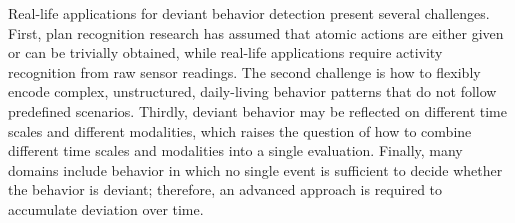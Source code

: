 %
Real-life applications for deviant behavior detection present several challenges. First, plan recognition research has assumed that atomic actions are either given or can be trivially obtained, while real-life applications require activity recognition from raw sensor readings. The second challenge is how to flexibly encode complex, unstructured, daily-living behavior patterns that do not follow predefined scenarios. Thirdly, deviant behavior may be reflected on different time scales and different modalities, which raises the question of how to combine different time scales and modalities into a single evaluation. Finally, many domains include behavior in which no single event is sufficient to decide whether the behavior is deviant; therefore, an advanced approach is required to 
accumulate deviation over time. 

